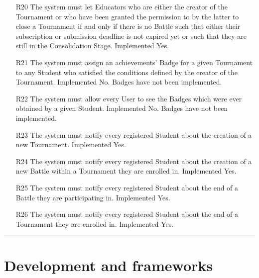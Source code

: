 \documentclass{Configuration_Files/Template}
\begin{document}
\begin{enumerate}
    \item[\textcolor{bluepoli}{R20}] The system must let Educators who are either the creator of the Tournament or who have been granted the permission to by the latter to close a Tournament if and only if there is no Battle such that either their subscription or submission deadline is not expired yet or such that they are still in the Consolidation Stage.
    \textcolor{bluepoli}{Implemented} Yes.
    
    \item[\textcolor{bluepoli}{R21}] The system must assign an achievements’ Badge for a given Tournament to any Student who satisfied the conditions defined by the creator of the Tournament.
    \textcolor{bluepoli}{Implemented} No. Badges have not been implemented.
    
    \item[\textcolor{bluepoli}{R22}] The system must allow every User to see the Badges which were ever obtained by a given Student.
    \textcolor{bluepoli}{Implemented} No. Badges have not been implemented.
    
    \item[\textcolor{bluepoli}{R23}] The system must notify every registered Student about the creation of a new Tournament.
    \textcolor{bluepoli}{Implemented} Yes.
    
    \item[\textcolor{bluepoli}{R24}] The system must notify every registered Student about the creation of a new Battle within a Tournament they are enrolled in.
    \textcolor{bluepoli}{Implemented} Yes.
    
    \item[\textcolor{bluepoli}{R25}] The system must notify every registered Student about the end of a Battle they are participating in.
    \textcolor{bluepoli}{Implemented} Yes.
    
    \item[\textcolor{bluepoli}{R26}] The system must notify every registered Student about the end of a Tournament they are enrolled in.
    \textcolor{bluepoli}{Implemented} Yes.
    
\end{enumerate}

{\color{bluepoli}\rule{\linewidth}{0.1pt}}

\chapter{Development and frameworks}
\end{document}
